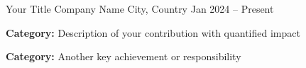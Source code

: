 

\begin{cventries}

  \cventry
    {Your Title}
    {Company Name}
    {City, Country}
    {Jan 2024 -- Present}
    {
      \begin{cvitems}
        \item {\textbf{Category:} Description of your contribution with quantified impact}
        \item {\textbf{Category:} Another key achievement or responsibility}
      \end{cvitems}
    }

\end{cventries}
